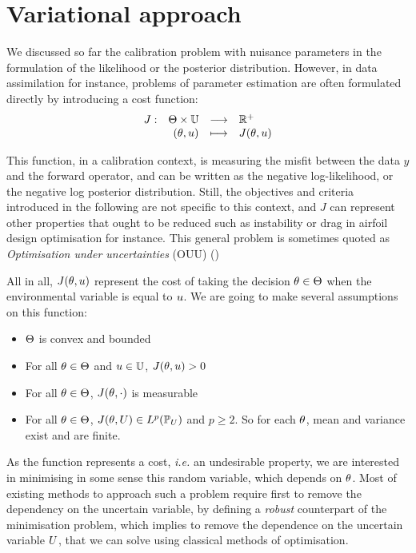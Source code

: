 \documentclass[../../Main_ManuscritThese.tex]{subfiles}
\begin{document}
\clearpage
\section{Variational approach}
\label{sec:J_rv}
We discussed so far the calibration problem with nuisance parameters
in the formulation of the likelihood or the posterior
distribution. However, in data assimilation for instance, problems of
parameter estimation are often formulated directly by introducing a
cost function:
\begin{equation}
  \begin{array}{rrcl}
    J: &\Theta \times \mathbb{U} &\longrightarrow& \mathbb{R}^+ \\
    &(\theta, u) &\longmapsto &J(\theta, u)
    \end{array}
  \end{equation}
  
  This function, in a calibration context, is measuring the misfit
  between the data $y$ and the forward operator, and can be written as
  the negative log-likelihood, or the negative log posterior
  distribution. Still, the objectives and criteria introduced in the
  following are not specific to this context, and $J$ can represent
  other properties that ought to be reduced such as instability or
  drag in airfoil design optimisation for instance. This general
  problem is sometimes quoted as \emph{Optimisation under
    uncertainties} (OUU)
  (\cite{cook_effective_2018,seshadri_density-matching_2014})


All in all, $J(\theta, u)$ represent the cost of taking the decision $\theta\in\Theta$ when the environmental variable is equal to $u$.
We are going to make several assumptions on this function:
\begin{itemize}
\item $\Theta$ is convex and bounded 
\item For all $\theta \in \Theta$ and $u \in \mathbb{U}$, $J(\theta, u)>0$
\item For all $\theta \in \Theta$, $J(\theta, \cdot)$ is measurable
\item For all $\theta \in \Theta$, $J(\theta, U) \in L^p(\mathbb{P}_{U})$ and $p \geq 2$. So for each $\theta$, mean and variance exist and are finite.
\end{itemize}

As the function represents a cost, \emph{i.e.} an undesirable
property, we are interested in minimising in some sense this random
variable, which depends on $\theta$.  Most of existing methods to
approach such a problem require first to remove the dependency on the
uncertain variable, by defining a \emph{robust} counterpart of the
minimisation problem, which implies to remove the dependence on the
uncertain variable $U$, that we can solve using classical methods of
optimisation.
\end{document}
